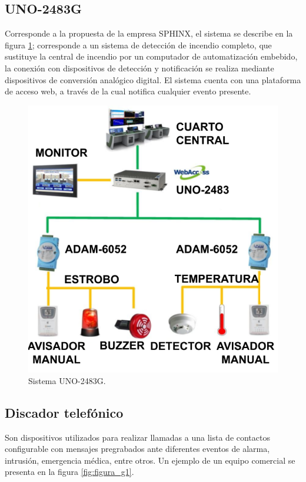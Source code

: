 \subsection{UNO-2483G}

Corresponde a la propuesta de la empresa SPHINX, el sistema se describe en la figura \ref{fig:figura_f1}; corresponde a un sistema de detección de incendio completo, que sustituye la central de incendio por un computador de automatización embebido, la conexión con dispositivos de detección y notificación se realiza mediante dispositivos de conversión analógico digital. El sistema cuenta con una plataforma de acceso web, a través de la cual notifica cualquier evento presente.  
	
	\begin{figure}[h]
	\centering
	\includegraphics[scale=.4]{./Figures/Capitulo1/FIG_F1.png}
	\caption{Sistema UNO-2483G.}
	\label{fig:figura_f1}
\end{figure}

\subsection{Discador telefónico}

Son dispositivos utilizados para realizar llamadas a una lista de contactos configurable con mensajes pregrabados ante diferentes eventos de alarma, intrusión, emergencia médica, entre otros. Un ejemplo de un equipo comercial se presenta en la figura  \ref{fig:figura_g1}.  

